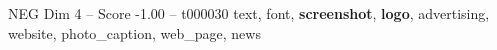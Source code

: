 \begin{textsample}{NEG Dim 4 – Score -1.00 – t000030}  \label{ex:f4_neg_029}
text, font, \textbf{screenshot}, \textbf{logo}, advertising, website, photo\_caption, web\_page, news

\end{textsample}
